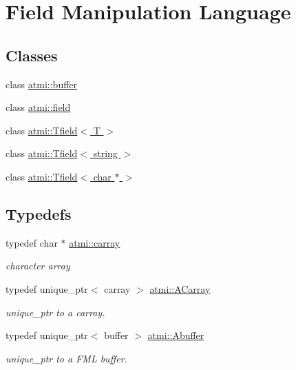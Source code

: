 \hypertarget{group__fml}{}\section{Field Manipulation Language}
\label{group__fml}
\subsection*{Classes}
\begin{DoxyCompactItemize}
\item 
class \hyperlink{classatmi_1_1buffer}{atmi\+::buffer}
\item 
class \hyperlink{classatmi_1_1field}{atmi\+::field}
\item 
class \hyperlink{classatmi_1_1_tfield}{atmi\+::\+Tfield$<$ T $>$}
\item 
class \hyperlink{classatmi_1_1_tfield_3_01string_01_4}{atmi\+::\+Tfield$<$ string $>$}
\item 
class \hyperlink{classatmi_1_1_tfield_3_01char_01_5_01_4}{atmi\+::\+Tfield$<$ char $\ast$ $>$}
\end{DoxyCompactItemize}
\subsection*{Typedefs}
\begin{DoxyCompactItemize}
\item 
\hypertarget{group__fml_ga8b57f9a4e2453d8e5d82ac0016e35e87}{}typedef char $\ast$ \hyperlink{group__fml_ga8b57f9a4e2453d8e5d82ac0016e35e87}{atmi\+::carray}\label{group__fml_ga8b57f9a4e2453d8e5d82ac0016e35e87}

\begin{DoxyCompactList}\small\item\em character array \end{DoxyCompactList}\item 
\hypertarget{group__fml_ga374230d2a2355a879f42c829eb2d70ff}{}typedef unique\+\_\+ptr$<$ carray $>$ \hyperlink{group__fml_ga374230d2a2355a879f42c829eb2d70ff}{atmi\+::\+A\+Carray}\label{group__fml_ga374230d2a2355a879f42c829eb2d70ff}

\begin{DoxyCompactList}\small\item\em unique\+\_\+ptr to a carray. \end{DoxyCompactList}\item 
\hypertarget{group__fml_ga268bae34ffaa2c2e72fabbcb54841934}{}typedef unique\+\_\+ptr$<$ buffer $>$ \hyperlink{group__fml_ga268bae34ffaa2c2e72fabbcb54841934}{atmi\+::\+Abuffer}\label{group__fml_ga268bae34ffaa2c2e72fabbcb54841934}

\begin{DoxyCompactList}\small\item\em unique\+\_\+ptr to a F\+M\+L buffer. \end{DoxyCompactList}\end{DoxyCompactItemize}
